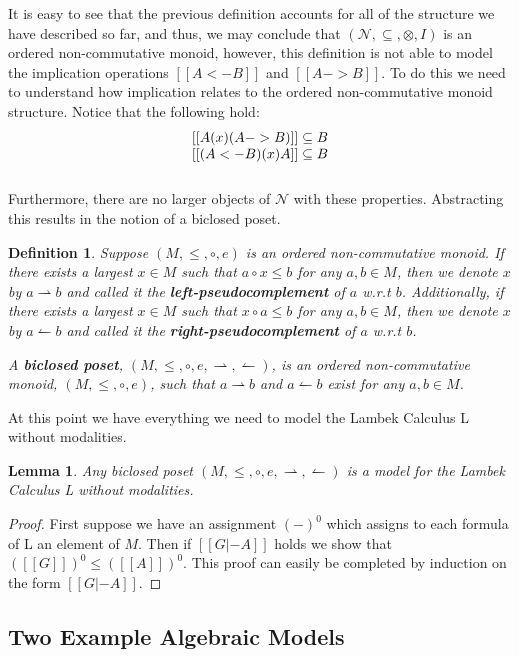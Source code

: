 \documentclass{article}
\newcommand{\N}{\mathcal{N}}
\newcommand{\rto}{\leftharpoonup}
\newcommand{\lto}{\rightharpoonup}
\newtheorem{lemma}[theorem]{Lemma}
\newtheorem{definition}[theorem]{Definition}
\begin{document}
It is easy to see that the previous definition accounts for all of the
structure we have described so far, and thus, we may conclude that
$(\N, \subseteq, \otimes, I)$ is an ordered non-commutative monoid,
however, this definition is not able to model the implication
operations $[[A <- B]]$ and $[[A -> B]]$.  To do this we need to
understand how implication relates to the ordered non-commutative
monoid structure.  Notice that the following hold:
\[
\begin{array}{lll}
  [[A (x) (A -> B)]] \subseteq B\\ \relax
  [[(A <- B) (x) A]] \subseteq B\\ \relax
\end{array}
\]
Furthermore, there are no larger objects of $\N$ with these
properties.  Abstracting this results in the notion of a biclosed
poset.
\begin{definition}
  \label{def:biclosed-poset}
  Suppose $(M, \leq, \circ, e)$ is an ordered non-commutative monoid.
  If there exists a largest $x \in M$ such that $a \circ x \leq b$ for
  any $a, b \in M$, then we denote $x$ by $a \lto b$ and called it
  the \textbf{left-pseudocomplement} of $a$ w.r.t $b$.  Additionally,
  if there exists a largest $x \in M$ such that $x \circ a \leq b$ for
  any $a, b \in M$, then we denote $x$ by $a \rto b$ and called it
  the \textbf{right-pseudocomplement} of $a$ w.r.t $b$.

  A \textbf{biclosed poset}, $(M, \leq, \circ, e, \lto, \rto)$, is an
  ordered non-commutative monoid, $(M, \leq, \circ, e)$, such that $a
  \lto b$ and $a \rto b$ exist for any $a,b \in M$.
\end{definition}

At this point we have everything we need to model the Lambek Calculus
L without modalities.
\begin{lemma}
  \label{lemma:biclosed-poset-model-L}
  Any biclosed poset $(M, \leq, \circ, e, \lto, \rto)$ is a model for
  the Lambek Calculus L without modalities.
\end{lemma}
\begin{proof}
  First suppose we have an assignment $(-)^0$ which assigns to each
  formula of L an element of $M$.  Then if $[[G |- A]]$ holds we
  show that $([[G]])^0 \leq ([[A]])^0$.  This proof can easily be
  completed by induction on the form $[[G |- A]]$.  
\end{proof}

\subsection{Two Example Algebraic Models}
\label{subsec:two_example_algebraic_models}
\end{document}
